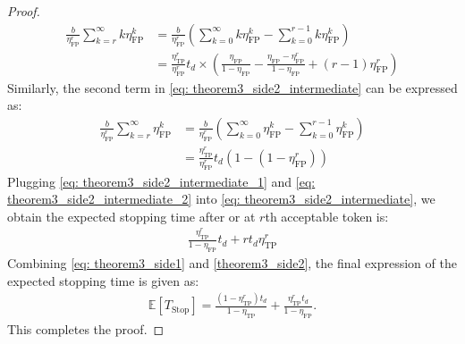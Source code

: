 \documentclass{article}
\theoremstyle{plain}
\theoremstyle{definition}
\theoremstyle{remark}
\begin{document}
\begin{proof}
\begin{align}
        \frac{b}{\eta_\text{FP}^r}\sum_{k=r}^{\infty}k\eta_\text{FP}^k &= \frac{b}{\eta_\text{FP}^r}\left(\sum_{k=0}^{\infty}k\eta_\text{FP}^k -\sum_{k=0}^{r-1}k\eta_\text{FP}^k \right) \nonumber\\
        & = \frac{\eta_\text{TP}^r}{\eta_\text{FP}^r} t_d\times\left(\frac{\eta_\text{FP}}{1-\eta_\text{FP}}-\frac{\eta_\text{FP}-\eta_\text{FP}^{r}}{1-\eta_\text{FP}} +(r-1)\eta_\text{FP}^{r}\right) \label{eq: theorem3_side2_intermediate_1}
    \end{align}
    Similarly, the second term in \eqref{eq: theorem3_side2_intermediate} can be expressed as:
    \begin{align}
        \frac{b}{\eta_\text{FP}^r}\sum_{k=r}^{\infty} \eta_\text{FP}^{k} &= \frac{b}{\eta_\text{FP}^r}\left(\sum_{k=0}^{\infty}\eta_\text{FP}^k -\sum_{k=0}^{r-1}\eta_\text{FP}^k\right)  \nonumber\\
        &=\frac{\eta_\text{TP}^r}{\eta_\text{FP}^r} t_d \left(1- (1-\eta_\text{FP}^r)\right) \label{eq: theorem3_side2_intermediate_2}
    \end{align}
    Plugging \eqref{eq: theorem3_side2_intermediate_1} and \eqref{eq: theorem3_side2_intermediate_2} into \eqref{eq: theorem3_side2_intermediate}, we obtain the expected stopping time after or at $r$th acceptable token is:
    \begin{align}
        \frac{\eta_\text{TP}^r}{1-\eta_\text{FP}}t_d+rt_d\eta_\text{TP}^r \label{theorem3_side2}
    \end{align}
    Combining \eqref{eq: theorem3_side1} and \eqref{theorem3_side2}, the final expression of the expected stopping time is given as:
    \begin{align}
        \mathbb{E}[T_\text{Stop}] =  \frac{(1-\eta_{\text{TP}}^r) t_d}{1-\eta_\text{TP}} + \frac{\eta_\text{TP}^rt_d}{1-\eta_\text{FP}}.
    \end{align}
    This completes the proof.
\end{proof}
\end{document}
